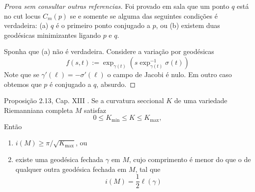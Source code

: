 \begin{proof}[Prova sem consultar outras referencias]
Foi provado em sala que um ponto $q$ está no cut locus $C_m(p)$ se e somente se
alguma das seguintes condições é verdadeira: (a) $q$ é o primeiro ponto
conjugado a $p$, ou (b) existem duas geodésicas minimizantes ligando $p$ e $q$.

Sponha que (a) não é verdadeira. Considere a variação por geodésicas 
$$
f(s,t):=\operatorname{exp}_{\gamma(t)}
(s\operatorname{exp}_{\gamma(t)}^{-1}\sigma(t))
$$
Note que se $\gamma'(\ell)=-\sigma'(\ell)$ o campo de Jacobi é nulo. Em outro
caso obtemos que $p$ é conjugado a $q$, absurdo.
\end{proof}

\begin{exercise}
Proposição 2.13, Cap. XIII \cite{doc}. Se a curvatura seccional $K$ de uma
variedade Riemanniana completa $M$ satisfaz
$$
0\leq K_{\operatorname{min}}\leq K\leq K_{\operatorname{max}},
$$
Então
\begin{enumerate}
\item $i(M) \geq \pi/\sqrt{K_{\operatorname{max}}}$, ou
\item existe uma geodésica fechada $\gamma$ em $M$, cujo comprimento é menor do 
que o de qualquer outra geodésica fechada em $M$, tal que
$$
i(M)=\frac{1}{2}\ell(\gamma)
$$

\end{enumerate}
\end{exercise}







